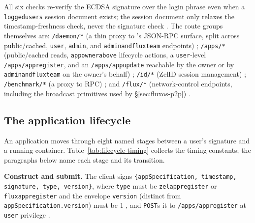 All six checks re-verify the ECDSA signature over the login phrase even when a \texttt{loggedusers}
session document exists; the session document only relaxes the timestamp-freshness check, never the
signature check . The route
groups themselves are: \texttt{/daemon/*} (a thin proxy to \fluxd's JSON-RPC surface, split across
public/cached, \texttt{user}, \texttt{admin}, and \texttt{adminandfluxteam} endpoints)
; \texttt{/apps/*} (public/cached reads,
\texttt{appownerabove} lifecycle actions, a \texttt{user}-level \texttt{/\allowbreak{}apps/\allowbreak{}appregister}, and an
\texttt{/\allowbreak{}apps/\allowbreak{}appupdate} reachable by the owner or by \texttt{adminandfluxteam} on the owner's
behalf) ; \texttt{/id/*} (ZelID session
management) ; \texttt{/benchmark/*} (a proxy to
\fluxbench RPC) ; and
\texttt{/flux/*} (network-control endpoints, including the broadcast primitives used by
\S\ref{sec:fluxos-p2p}) .

\subsection{The application lifecycle}
\label{sec:fluxos-lifecycle}

An application moves through eight named stages between a user's signature and a running
container. Table~\ref{tab:lifecycle-timing} collects the timing constants; the paragraphs below name
each stage and its transition.

\textbf{Construct and submit.} The client signs \texttt{\{appSpecification,\allowbreak{} timestamp,\allowbreak{} signature,\allowbreak{}
type,\allowbreak{} version\}}, where \texttt{type} must be \texttt{zelappregister} or \texttt{fluxappregister}
and the envelope \texttt{version} (distinct from \texttt{appSpecification.\allowbreak{}version}) must be 1
, and \texttt{POST}s
it to \texttt{/\allowbreak{}apps/\allowbreak{}appregister} at \texttt{user} privilege
.

